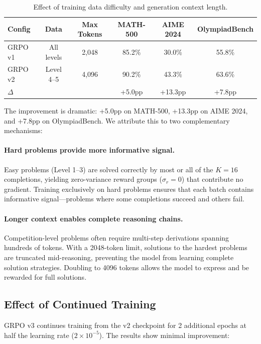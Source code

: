 \documentclass[11pt,a4paper]{article}
\begin{document}
\begin{table}[H]
\centering
\caption{Effect of training data difficulty and generation context length.}
\label{tab:grpo-ablation}
\begin{tabular}{lccccc}
\toprule
\textbf{Config} & \textbf{Data} & \textbf{Max Tokens} & \textbf{MATH-500} & \textbf{AIME 2024} & \textbf{OlympiadBench} \\
\midrule
GRPO v1 & All levels & 2,048 & 85.2\% & 30.0\% & 55.8\% \\
GRPO v2 & Level 4--5 & 4,096 & 90.2\% & 43.3\% & 63.6\% \\
\midrule
$\Delta$ & & & +5.0pp & +13.3pp & +7.8pp \\
\bottomrule
\end{tabular}
\end{table}

The improvement is dramatic: +5.0pp on MATH-500, +13.3pp on AIME 2024, and +7.8pp on OlympiadBench. We attribute this to two complementary mechanisms:

\paragraph{Hard problems provide more informative signal.} Easy problems (Level 1--3) are solved correctly by most or all of the $K=16$ completions, yielding zero-variance reward groups ($\sigma_r = 0$) that contribute no gradient. Training exclusively on hard problems ensures that each batch contains informative signal---problems where some completions succeed and others fail.

\paragraph{Longer context enables complete reasoning chains.} Competition-level problems often require multi-step derivations spanning hundreds of tokens. With a 2048-token limit, solutions to the hardest problems are truncated mid-reasoning, preventing the model from learning complete solution strategies. Doubling to 4096 tokens allows the model to express and be rewarded for full solutions.

\subsection{Effect of Continued Training}

GRPO v3 continues training from the v2 checkpoint for 2 additional epochs at half the learning rate ($2\times10^{-5}$). The results show minimal improvement:
\end{document}
